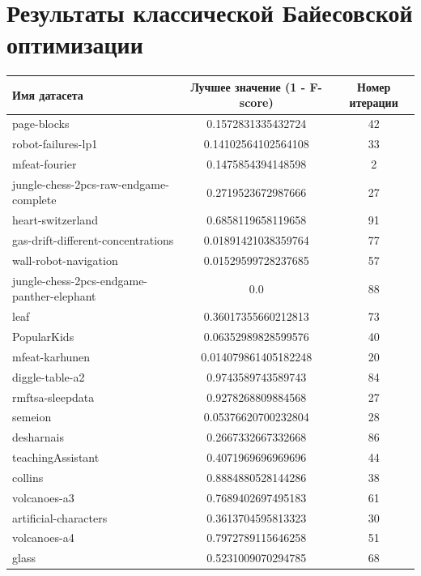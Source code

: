 \documentclass[times,specification,annotation]{itmo-student-thesis}
\begin{document}
	\chapter{Результаты классической Байесовской оптимизации}\label{sec:app:1}
	\begin{center}
		\begin{longtable}{ |m{5cm}|c|c| } 
			\hline
			\textbf{Имя датасета} & \textbf{Лучшее значение (1 - F-score)} & \textbf{Номер итерации} \\ 
			\hline\hline
			page-blocks & 0.1572831335432724 & 42 \\
			\hline
			robot-failures-lp1 & 0.14102564102564108 & 33 \\
			\hline
			mfeat-fourier & 0.1475854394148598 & 2 \\
			\hline
			jungle-chess-2pcs-raw-endgame-complete & 0.2719523672987666 & 27 \\
			\hline
			heart-switzerland & 0.6858119658119658 & 91 \\
			\hline
			gas-drift-different-concentrations & 0.01891421038359764 & 77 \\
			\hline
			wall-robot-navigation & 0.01529599728237685 & 57 \\
			\hline
			jungle-chess-2pcs-endgame-panther-elephant & 0.0 & 88 \\
			\hline
			leaf & 0.36017355660212813 & 73 \\
			\hline
			PopularKids & 0.06352989828599576 & 40 \\
			\hline
			mfeat-karhunen & 0.014079861405182248 & 20 \\
			\hline
			diggle-table-a2 & 0.9743589743589743 & 84 \\
			\hline
			rmftsa-sleepdata & 0.9278268809884568 & 27 \\
			\hline
			semeion & 0.05376620700232804 & 28 \\
			\hline
			desharnais & 0.2667332667332668 & 86 \\
			\hline
			teachingAssistant & 0.4071969696969696 & 44 \\
			\hline
			collins & 0.8884880528144286 & 38 \\
			\hline
			volcanoes-a3 & 0.7689402697495183 & 61 \\
			\hline
			artificial-characters & 0.3613704595813323 & 30 \\
			\hline
			volcanoes-a4 & 0.7972789115646258 & 51 \\
			\hline
			glass & 0.5231009070294785 & 68 \\

\end{longtable}
\end{center}
\end{document}
